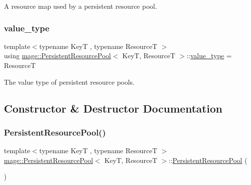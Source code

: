 A resource map used by a persistent resource pool. \hypertarget{classmage_1_1_persistent_resource_pool_a2311ac7d92bb3c23950c2d88e9213d16}{}\label{classmage_1_1_persistent_resource_pool_a2311ac7d92bb3c23950c2d88e9213d16} 
\subsubsection{\texorpdfstring{value\+\_\+type}{value\_type}}
{\footnotesize\ttfamily template$<$typename KeyT , typename ResourceT $>$ \\
using \hyperlink{classmage_1_1_persistent_resource_pool}{mage\+::\+Persistent\+Resource\+Pool}$<$ KeyT, ResourceT $>$\+::\hyperlink{classmage_1_1_persistent_resource_pool_a2311ac7d92bb3c23950c2d88e9213d16}{value\+\_\+type} =  ResourceT}

The value type of persistent resource pools. 

\subsection{Constructor \& Destructor Documentation}
\hypertarget{classmage_1_1_persistent_resource_pool_a23b83adf594628b93c368a2da7660ef8}{}\label{classmage_1_1_persistent_resource_pool_a23b83adf594628b93c368a2da7660ef8} 
\subsubsection{\texorpdfstring{Persistent\+Resource\+Pool()}{PersistentResourcePool()}\hspace{0.1cm}{\footnotesize\ttfamily [1/3]}}
{\footnotesize\ttfamily template$<$typename KeyT , typename ResourceT $>$ \\
\hyperlink{classmage_1_1_persistent_resource_pool}{mage\+::\+Persistent\+Resource\+Pool}$<$ KeyT, ResourceT $>$\+::\hyperlink{classmage_1_1_persistent_resource_pool}{Persistent\+Resource\+Pool} (\begin{DoxyParamCaption}{ }\end{DoxyParamCaption})\hspace{0.3cm}{\ttfamily [default]}}

